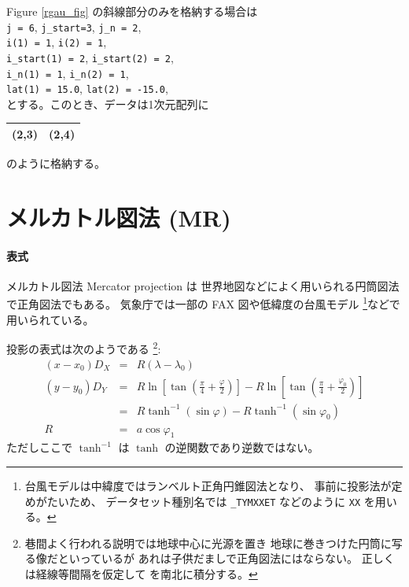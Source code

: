 Figure \ref{rgau_fig} の斜線部分のみを格納する場合は\\
{\tt j = 6}, {\tt j\_start=3}, {\tt j\_n = 2}, \\
{\tt i(1) = 1}, {\tt i(2) = 1}, \\
{\tt i\_start(1) = 2}, {\tt i\_start(2) = 2}, \\
{\tt i\_n(1) = 1}, {\tt i\_n(2) = 1}, \\
{\tt lat(1) = 15.0}, {\tt lat(2) = -15.0}, \\
とする。このとき、データは1次元配列に
\begin{center}
\begin{tabular}{|c|c|} \hline
(2,3) & (2,4)\\ \hline
\end{tabular} 
\end{center}
のように格納する。

\section{メルカトル図法 (MR)}

\paragraph{表式}
メルカトル図法 Mercator projection は
世界地図などによく用いられる円筒図法で正角図法でもある。
気象庁では一部の FAX 図や低緯度の台風モデル%
\footnote{
	台風モデルは中緯度ではランベルト正角円錐図法となり、
	事前に投影法が定めがたいため、
	データセット種別名では {\tt \_TYMXXET} などのように {\tt XX} を用いる。
}などで用いられている。

投影の表式は次のようである%
\footnote{
	巷間よく行われる説明では地球中心に光源を置き
	地球に巻きつけた円筒に写る像だといっているが
	あれは子供だましで正角図法にはならない。
	正しくは経線等間隔を仮定して
	を南北に積分する。
}:
\begin{eqnarray}
 (x - x_0) D_X &=& R (\lambda - \lambda_0)
\\
 (y - y_0) D_Y &=&
 	R \ln\left[\tan\left(\frac{\pi}{4} + \frac{\varphi}{2}\right)\right]
 	-R \ln\left[\tan\left(\frac{\pi}{4} + \frac{\varphi_0}{2}\right)\right]
\\
	&=& R \tanh^{-1}(\sin\varphi)
	- R \tanh^{-1}(\sin\varphi_0)
\\
 R &=& a\cos\varphi_1
\end{eqnarray}
ただしここで \(\tanh^{-1}\) は \(\tanh\) の逆関数であり逆数ではない。

